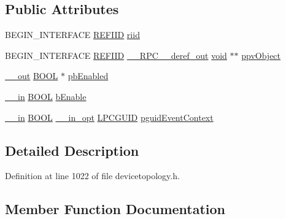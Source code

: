 \subsection*{Public Attributes}
\begin{DoxyCompactItemize}
\item 
B\+E\+G\+I\+N\+\_\+\+I\+N\+T\+E\+R\+F\+A\+CE \hyperlink{px__win__ds_8c_a80ec49c8ae61e234197d5071d2df497d}{R\+E\+F\+I\+ID} \hyperlink{struct_i_audio_loudness_vtbl_a05666533cf4bd410c8e102681041c1eb}{riid}
\item 
B\+E\+G\+I\+N\+\_\+\+I\+N\+T\+E\+R\+F\+A\+CE \hyperlink{px__win__ds_8c_a80ec49c8ae61e234197d5071d2df497d}{R\+E\+F\+I\+ID} \hyperlink{rpcsal_8h_a23bc188526f10656f9c79d950f6c3192}{\+\_\+\+\_\+\+R\+P\+C\+\_\+\+\_\+deref\+\_\+out} \hyperlink{sound_8c_ae35f5844602719cf66324f4de2a658b3}{void} $\ast$$\ast$ \hyperlink{struct_i_audio_loudness_vtbl_a487235473f0bb39a74ec21ab487cd187}{ppv\+Object}
\item 
\hyperlink{sal_8h_abb4c3c1135aab6c47cff22e7c16efb74}{\+\_\+\+\_\+out} \hyperlink{nfilterkit_8h_a3be13892ae7076009afcf121347dd319}{B\+O\+OL} $\ast$ \hyperlink{struct_i_audio_loudness_vtbl_a23b662de1e5b0b68a27dadbb4a21e6ab}{pb\+Enabled}
\item 
\hyperlink{sal_8h_a3f6b8655e1aa9dfc15a9029f0343009e}{\+\_\+\+\_\+in} \hyperlink{nfilterkit_8h_a3be13892ae7076009afcf121347dd319}{B\+O\+OL} \hyperlink{struct_i_audio_loudness_vtbl_a656037af048a26950345542afc29ac2a}{b\+Enable}
\item 
\hyperlink{sal_8h_a3f6b8655e1aa9dfc15a9029f0343009e}{\+\_\+\+\_\+in} \hyperlink{nfilterkit_8h_a3be13892ae7076009afcf121347dd319}{B\+O\+OL} \hyperlink{sal_8h_a9c2d0f2980e51b51bb405ee2a31a3353}{\+\_\+\+\_\+in\+\_\+opt} \hyperlink{pa__win__wasapi_8c_a9c061ab1f26db8746b3dab38991f48a0}{L\+P\+C\+G\+U\+ID} \hyperlink{struct_i_audio_loudness_vtbl_a2e3193d7c8002971151b34062c20a817}{pguid\+Event\+Context}
\end{DoxyCompactItemize}


\subsection{Detailed Description}


Definition at line 1022 of file devicetopology.\+h.



\subsection{Member Function Documentation}
